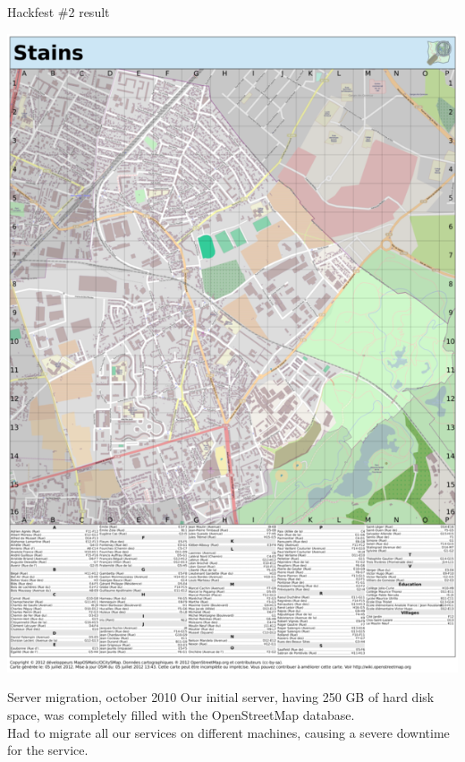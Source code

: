 \documentclass{beamer}
\begin{document}
\begin{frame}{Hackfest \#2 result}
  \begin{center}
    \includegraphics[height=0.8\textheight]{stains.png}
  \end{center}
\end{frame}

\begin{frame}{Server migration, october 2010}
  Our initial server, having 250 GB of hard disk space, was completely
  filled with the OpenStreetMap database.\\

  Had to migrate all our services on different machines, causing a
  severe downtime for the service.
\end{frame}
\end{document}
